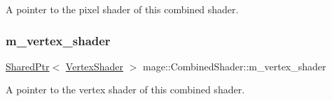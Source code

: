 A pointer to the pixel shader of this combined shader. \hypertarget{structmage_1_1_combined_shader_ae70a1404acc466fc7fbcb05756140f54}{}\label{structmage_1_1_combined_shader_ae70a1404acc466fc7fbcb05756140f54} 
\subsubsection{\texorpdfstring{m\+\_\+vertex\+\_\+shader}{m\_vertex\_shader}}
{\footnotesize\ttfamily \hyperlink{namespacemage_a1e01ae66713838a7a67d30e44c67703e}{Shared\+Ptr}$<$ \hyperlink{classmage_1_1_vertex_shader}{Vertex\+Shader} $>$ mage\+::\+Combined\+Shader\+::m\+\_\+vertex\+\_\+shader\hspace{0.3cm}{\ttfamily [private]}}

A pointer to the vertex shader of this combined shader. 